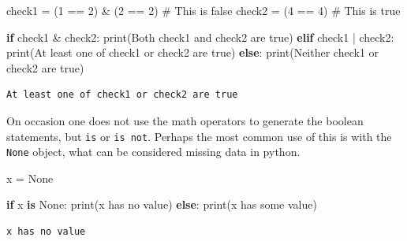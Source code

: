 \documentclass[
  letterpaper,
]{scrbook}
\newenvironment{Shaded}{\begin{snugshade}}{\end{snugshade}}
\newcommand{\BuiltInTok}[1]{\textcolor[rgb]{0.00,0.23,0.31}{#1}}
\newcommand{\CommentTok}[1]{\textcolor[rgb]{0.37,0.37,0.37}{#1}}
\newcommand{\ControlFlowTok}[1]{\textcolor[rgb]{0.00,0.23,0.31}{\textbf{#1}}}
\newcommand{\DecValTok}[1]{\textcolor[rgb]{0.68,0.00,0.00}{#1}}
\newcommand{\KeywordTok}[1]{\textcolor[rgb]{0.00,0.23,0.31}{\textbf{#1}}}
\newcommand{\NormalTok}[1]{\textcolor[rgb]{0.00,0.23,0.31}{#1}}
\newcommand{\OperatorTok}[1]{\textcolor[rgb]{0.37,0.37,0.37}{#1}}
\newcommand{\StringTok}[1]{\textcolor[rgb]{0.13,0.47,0.30}{#1}}
\newcommand{\VariableTok}[1]{\textcolor[rgb]{0.07,0.07,0.07}{#1}}
\begin{document}
\begin{Shaded}
\begin{Highlighting}[]
\NormalTok{check1 }\OperatorTok{=}\NormalTok{ (}\DecValTok{1} \OperatorTok{==} \DecValTok{2}\NormalTok{) }\OperatorTok{\&}\NormalTok{ (}\DecValTok{2} \OperatorTok{==} \DecValTok{2}\NormalTok{) }\CommentTok{\# This is false}
\NormalTok{check2 }\OperatorTok{=}\NormalTok{ (}\DecValTok{4} \OperatorTok{==} \DecValTok{4}\NormalTok{)            }\CommentTok{\# This is true}

\ControlFlowTok{if}\NormalTok{ check1 }\OperatorTok{\&}\NormalTok{ check2:}
  \BuiltInTok{print}\NormalTok{(}\StringTok{\textquotesingle{}Both check1 and check2 are true\textquotesingle{}}\NormalTok{)}
\ControlFlowTok{elif}\NormalTok{ check1 }\OperatorTok{|}\NormalTok{ check2:}
  \BuiltInTok{print}\NormalTok{(}\StringTok{\textquotesingle{}At least one of check1 or check2 are true\textquotesingle{}}\NormalTok{)}
\ControlFlowTok{else}\NormalTok{:}
  \BuiltInTok{print}\NormalTok{(}\StringTok{\textquotesingle{}Neither check1 or check2 are true\textquotesingle{}}\NormalTok{)}
\end{Highlighting}
\end{Shaded}

\begin{verbatim}
At least one of check1 or check2 are true
\end{verbatim}

On occasion one does not use the math operators to generate the boolean
statements, but \texttt{is} or \texttt{is\ not}. Perhaps the most common
use of this is with the \texttt{None} object, what can be considered
missing data in python.

\begin{Shaded}
\begin{Highlighting}[]
\NormalTok{x }\OperatorTok{=} \VariableTok{None}

\ControlFlowTok{if}\NormalTok{ x }\KeywordTok{is} \VariableTok{None}\NormalTok{:}
  \BuiltInTok{print}\NormalTok{(}\StringTok{\textquotesingle{}x has no value\textquotesingle{}}\NormalTok{)}
\ControlFlowTok{else}\NormalTok{:}
  \BuiltInTok{print}\NormalTok{(}\StringTok{\textquotesingle{}x has some value\textquotesingle{}}\NormalTok{)}
\end{Highlighting}
\end{Shaded}

\begin{verbatim}
x has no value
\end{verbatim}
\end{document}
